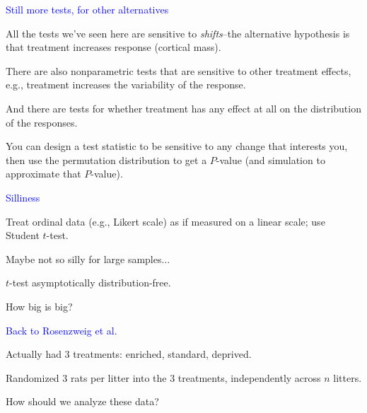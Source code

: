 \documentclass[landscape]{slides}
\begin{document}
\begin {slide}
{\textcolor{blue}{\sc Still more tests, for other alternatives}}

All the tests we've seen here are sensitive to {\em shifts\/}--the alternative
hypothesis is that treatment
increases response (cortical mass).

There are also nonparametric tests that are sensitive to other
treatment effects, e.g., treatment increases the variability of the 
response.

And there are tests for whether treatment has any effect at all on
the distribution of the responses.

You can design a test statistic to be sensitive to any change that
interests you, then use the permutation distribution to get a $P$-value
(and simulation to approximate that $P$-value).


\end{slide}

\begin {slide}
{\textcolor{blue}{\sc Silliness}}

Treat ordinal data (e.g., Likert scale) as if measured on a linear scale; 
use Student $t$-test.

Maybe not so silly for large samples$\ldots$

$t$-test asymptotically distribution-free.

How big is big?



\end{slide}


\begin {slide}
{\textcolor{blue}{\sc Back to Rosenzweig et al.}}

Actually had 3 treatments:  enriched, standard, deprived.

Randomized 3 rats per litter into the 3 treatments, independently across
$n$ litters.

{\textcolor{one}{How should we analyze these data?}}



\end{slide}
\end{document}
